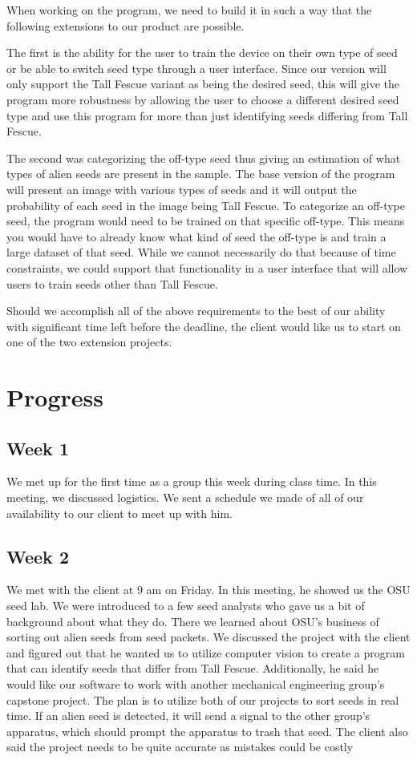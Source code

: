 \documentclass[onecolumn, draftclsnofoot,10pt, compsoc]{IEEEtran}
\begin{document}
	When working on the program, we need to build it in such a way that the following extensions to our product are possible.
	
	The first is the ability for the user to train the device on their own type of seed or be able to switch seed type through a user interface. Since our version will only support the Tall Fescue variant as being the desired seed, this will give the program more robustness by allowing the user to choose a different desired seed type and use this program for more than just identifying seeds differing from Tall Fescue.
	
	The second was categorizing the off-type seed thus giving an estimation of what types of alien seeds are present in the sample. The base version of the program will present an image with various types of seeds and it will output the probability of each seed in the image being Tall Fescue. To categorize an off-type seed, the program would need to be trained on that specific off-type. This means you would have to already know what kind of seed the off-type is and train a large dataset of that seed. While we cannot necessarily do that because of time constraints, we could support that functionality in a user interface that will allow users to train seeds other than Tall Fescue.   
	
	Should we accomplish all of the above requirements to the best of our ability with significant time left before the deadline, the client would like us to start on one of the two extension projects.
	
	
	\section{Progress}
	
	\subsection{Week 1}
	We met up for the first time as a group this week during class time. In this meeting, we discussed logistics. We sent a schedule we made of all of our availability to our client to meet up with him.
	\subsection{Week 2}
	We met with the client at 9 am on Friday. In this meeting, he showed us the OSU seed lab. We were introduced to a few seed analysts who gave us a bit of background about what they do. There we learned about OSU's business of sorting out alien seeds from seed packets. We discussed the project with the client and figured out that he wanted us to utilize computer vision to create a program that can identify seeds that differ from Tall Fescue. Additionally, he said he would like our software to work with another mechanical engineering group's capstone project. The plan is to utilize both of our projects to sort seeds in real time. If an alien seed is detected, it will send a signal to the other group's apparatus, which should prompt the apparatus to trash that seed. The client also said the project needs to be quite accurate as mistakes could be costly 
\end{document}
